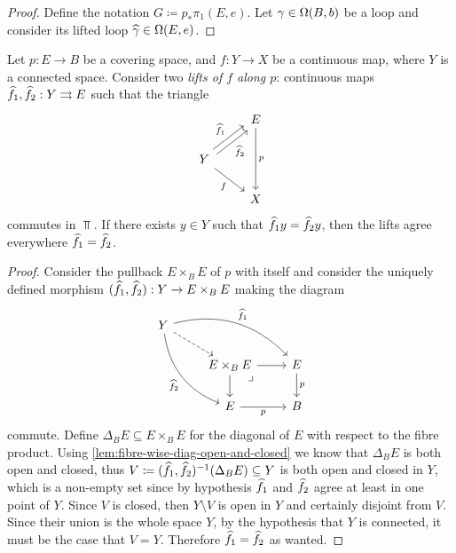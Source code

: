 \begin{proof}
Define the notation \(G \coloneq p_{*} \pi_1(E, e)\). Let
\(\gamma \in \operatorname{\Omega}(B, b)\) be a loop and consider its lifted loop
\(\widehat \gamma \in \operatorname{\Omega}(E, e)\).
\end{proof}

\begin{theorem}
\label{thm:lifting-out-of-connected-space}
Let \(p: E \to B\) be a covering space, and \(f: Y \to X\) be a continuous map,
where \(Y\) is a connected space. Consider two \emph{lifts of \(f\) along
  \(p\)}: continuous maps \(\widehat f_1, \widehat f_2: Y \rightrightarrows E\) such that
the triangle
\[
\begin{tikzcd}
&E \ar[dd, "p"] \\
Y \ar[ru, shift left, "\lift f_1"]
\ar[ru, shift right, "\lift f_2"']
\ar[dr, "f"']
&
\\
&X
\end{tikzcd}
\]
commutes in \(\Top\). If there exists \(y \in Y\) such that
\(\widehat f_1 y = \widehat f_2 y\), then the lifts agree everywhere
\(\widehat f_1 = \widehat f_2\).
\end{theorem}

\begin{proof}
Consider the pullback \(E \times_B E\) of \(p\) with itself and consider the
uniquely defined morphism \((\widehat f_1, \widehat f_2): Y \to E \times_B E\)
making the diagram
\[
\begin{tikzcd}
Y \ar[rrd, bend left, "\lift{f}_1"]
\ar[ddr, "\lift{f}_2"', bend right]
\ar[rd, dashed]
& &
\\
&E \times_B E \ar[r] \ar[d]
\ar[rd, phantom, "\lrcorner", very near start]
&E \ar[d, "p"]
\\
&E \ar[r, "p"']
&B
\end{tikzcd}
\]
commute. Define \(\Delta_B E \subseteq E \times_B E\) for the diagonal of \(E\)
with respect to the fibre product. Using
\cref{lem:fibre-wise-diag-open-and-closed} we know that \(\Delta_B E\) is both
open and closed, thus
\(V \coloneq (\widehat f_1, \widehat f_2)^{-1}(\Delta_B E) \subseteq Y\) is both
open and closed in \(Y\), which is a non-empty set since by hypothesis
\(\widehat f_1\) and \(\widehat f_2\) agree at least in one point of
\(Y\). Since \(V\) is closed, then \(Y \setminus V\) is open in \(Y\) and
certainly disjoint from \(V\). Since their union is the whole space \(Y\), by
the hypothesis that \(Y\) is connected, it must be the case that \(V =
Y\). Therefore \(\widehat f_1 = \widehat f_2\) as wanted.
\end{proof}

